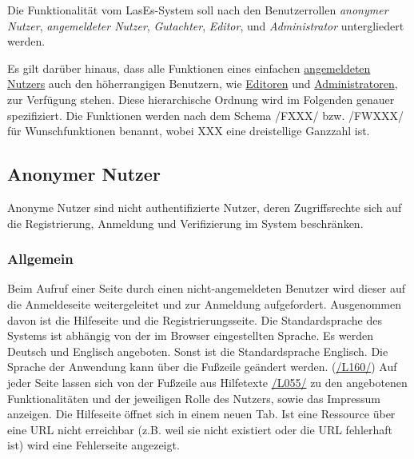 

Die Funktionalität vom LasEs-System soll nach den Benutzerrollen
\textit{anonymer Nutzer}, \textit{angemeldeter Nutzer}, \textit{Gutachter}, \textit{Editor}, und
\textit{Administrator} untergliedert werden.

Es gilt darüber hinaus, dass alle Funktionen eines einfachen \hyperref[glo:regnutzer]{angemeldeten Nutzers} auch den höherrangigen Benutzern, wie \hyperref[glo:editor]{Editoren}
und \hyperref[glo:admin]{Administratoren}, zur Verfügung stehen. Diese hierarchische Ordnung wird im Folgenden genauer spezifiziert.
Die Funktionen werden nach dem Schema /FXXX/ bzw. /FWXXX/ für Wunschfunktionen benannt, wobei XXX eine dreistellige Ganzzahl ist.

\subsection{Anonymer Nutzer}\label{funkt:nutzer}
Anonyme Nutzer sind nicht authentifizierte Nutzer, deren Zugriffsrechte sich
auf die Registrierung, Anmeldung und Verifizierung im System beschränken.

\subsubsection{Allgemein}
\begin{description}
     Beim Aufruf einer Seite durch einen nicht-angemeldeten Benutzer
    wird dieser auf die Anmeldeseite weitergeleitet und zur
    Anmeldung aufgefordert. Ausgenommen davon ist die Hilfeseite und die Registrierungsseite.
     Die Standardsprache des Systems ist abhängig von der im Browser
    eingestellten Sprache. Es werden Deutsch und Englisch angeboten.
    Sonst ist die Standardsprache Englisch. Die Sprache der Anwendung kann über die
    Fußzeile geändert werden. (\hyperref[leist:160]{/L160/})
     Auf jeder Seite lassen sich von der Fußzeile aus
    Hilfetexte \hyperref[leist:055]{/L055/} zu den angebotenen Funktionalitäten und der jeweiligen Rolle
    des Nutzers, sowie das Impressum anzeigen. Die Hilfeseite öffnet sich in einem neuen Tab.
     Ist eine Ressource über eine URL nicht erreichbar (z.B. weil sie nicht existiert oder
     die URL fehlerhaft ist) wird eine Fehlerseite angezeigt.
\end{description}

